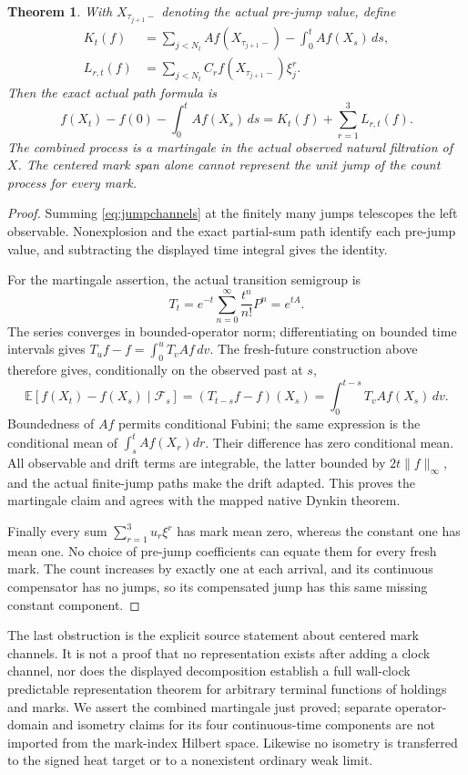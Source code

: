 \documentclass[11pt]{article}
\newtheorem{theorem}{Theorem}[section]
\newcommand{\E}{\mathbb E}\newcommand{\Pp}{\mathbb P}
\begin{document}
\begin{theorem}\label{thm:clockdecomp}
With $X_{\tau_{j+1}-}$ denoting the actual pre-jump value, define
\begin{align*}
 K_t(f)&=\sum_{j<N_t}Af(X_{\tau_{j+1}-})
              -\int_0^t Af(X_s)\,ds,\\
 L_{r,t}(f)&=\sum_{j<N_t}C_rf(X_{\tau_{j+1}-})\xi_j^r.
\end{align*}
Then the exact actual path formula is
\[
 f(X_t)-f(0)-\int_0^tAf(X_s)\,ds
 =K_t(f)+\sum_{r=1}^3L_{r,t}(f).
\]
The combined process is a martingale in the actual observed natural
filtration of $X$. The centered mark span alone cannot represent the
unit jump of the count process for every mark.
\end{theorem}
\begin{proof}
Summing \eqref{eq:jumpchannels} at the finitely many jumps telescopes
the left observable. Nonexplosion and the exact partial-sum path
identify each pre-jump value, and subtracting the displayed time
integral gives the identity.

For the martingale assertion, the actual transition semigroup is
\[
 T_t=e^{-t}\sum_{n=0}^\infty\frac{t^n}{n!}P^n=e^{tA}.
\]
The series converges in bounded-operator norm; differentiating on
bounded time intervals gives
$T_u f-f=\int_0^u T_v Af\,dv$. The fresh-future construction above
therefore gives, conditionally on the observed past at $s$,
\[
 \E[f(X_t)-f(X_s)\mid\mathcal F_s]
 =(T_{t-s}f-f)(X_s)
 =\int_0^{t-s}T_vAf(X_s)\,dv.
\]
Boundedness of $Af$ permits conditional Fubini; the same expression
is the conditional mean of $\int_s^t Af(X_r)dr$. Their difference
has zero conditional mean. All observable and drift terms are
integrable, the latter bounded by $2t\|f\|_\infty$, and the actual
finite-jump paths make the drift adapted. This proves the martingale
claim and agrees with the mapped native Dynkin theorem.

Finally every sum $\sum_{r=1}^3u_r\xi^r$ has mark mean zero, whereas
the constant one has mean one. No choice of pre-jump coefficients
can equate them for every fresh mark. The count increases by exactly
one at each arrival, and its continuous compensator has no jumps,
so its compensated jump has this same missing constant component.
\end{proof}

The last obstruction is the explicit source statement about centered
mark channels. It is not a proof that no representation exists after
adding a clock channel, nor does the displayed decomposition establish
a full wall-clock predictable representation theorem for arbitrary
terminal functions of holdings and marks. We assert the combined
martingale just proved; separate operator-domain and isometry claims
for its four continuous-time components are not imported from the
mark-index Hilbert space. Likewise no isometry is transferred to the
signed heat target or to a nonexistent ordinary weak limit.
\end{document}
